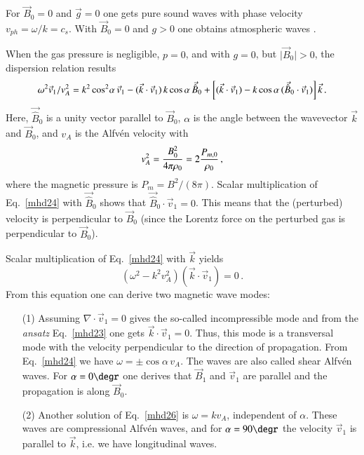 For $\vec B_0=0$ and $\vec g=0$ one gets pure sound waves with phase velocity $v_{ph}=\omega/k=c_s$. With $\vec B_0=0$ and $g>0$ one obtains atmospheric waves \citep{bray74}.

When the gas pressure is negligible, $p=0$, and with $g=0$, but $\vert\vec B_0\vert>0$, the dispersion relation results
\begin{equation}
\omega^2\vec v_1/v_A^2=k^2\cos^2\hspace{-0.5mm}\alpha\,\vec v_1
-(\vec k\cdot\vec v_1)\,k\cos\alpha\,\vec{\hat{B}}_0+\left[(\vec k\cdot\vec v_1)-k\cos\alpha\,(\vec{\hat{B}}_0\cdot\vec v_1)\right]\vec k\,.
\label{mhd24}
\end{equation}
Here, $\vec{\hat{B}}_0$ is a unity vector parallel to $\vec{{B}}_0$, $\alpha$ is the angle between the wavevector $\vec k$ and $\vec B_0$, and $v_A$ is the Alfv\'en velocity with 
\begin{equation}
v_A^2={B_0^2\over4\pi\rho_0}=2{P_{m,0}\over\rho_0}\,,
\label{mhd25}
\end{equation}
where the magnetic pressure is $P_{m}=B^2/(8\pi)$. Scalar multiplication of Eq.~\ref{mhd24} with $\vec{\hat{B}}_0$ shows that $\vec{\hat{B}}_0\cdot\vec v_1=0$. This means that the (perturbed) velocity is perpendicular to $\vec B_0$ (since the Lorentz force on the perturbed gas is perpendicular to $\vec B_0$). 

Scalar multiplication of Eq.~\ref{mhd24} with $\vec k$ yields
\begin{equation}
\left(\omega^2-k^2v_A^2\right)\left(\vec k\cdot\vec v_1\right) = 0\,.
\label{mhd26}
\end{equation}
From this equation one can derive two magnetic wave modes:
\begin{itemize}
\item[(1)] Assuming $\nabla\cdot\vec v_1=0$ gives the so-called incompressible mode and from  the {\em ansatz} Eq.~\ref{mhd23} one gets $\vec k\cdot\vec v_1=0$. Thus, this mode is a transversal mode with the velocity perpendicular to the direction of propagation. From Eq.~\ref{mhd24} we have $\omega=\pm\cos\alpha\,v_A$. The waves are also called shear Alfv\'en waves. For $\alpha=0\degr$ one derives that $\vec B_1$ and $\vec v_1$ are parallel and the propagation is along $\vec B_0$.\\
\item[(2)] Another solution of Eq.~\ref{mhd26} is $\omega=kv_A$, independent of $\alpha$. These waves are compressional Alfv\'en waves, and for $\alpha=90\degr$ the velocity $\vec v_1$ is parallel to $\vec k$, i.e. we have longitudinal waves.
 
\end{itemize}



